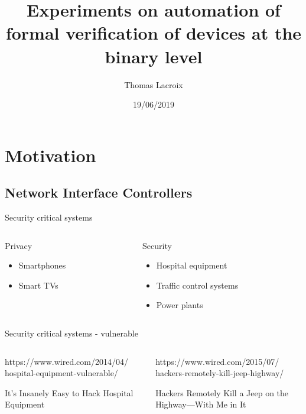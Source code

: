 \documentclass{beamer}
\title{Experiments on automation of formal verification of devices at the binary level}
\subtitle{}
\author{Thomas Lacroix}
\institute{INSA Lyon \\ Soutenance de PFE (Option R\&D)}
\date{19/06/2019}
\begin{document}
\begin{frame}
    \maketitle
\end{frame}


\section{Motivation}

\subsection{Network Interface Controllers}

\begin{frame}{Security critical systems}
    \begin{columns}
        \begin{column}{0.5\textwidth}
            Privacy

            \begin{itemize}
                \item Smartphones
                \item Smart TVs
            \end{itemize}
        \end{column}
        \begin{column}{0.5\textwidth}
            Security

            \begin{itemize}
                \item Hospital equipment
                \item Traffic control systems
                \item Power plants
            \end{itemize}
        \end{column}
    \end{columns}
\end{frame}

\begin{frame}{Security critical systems - vulnerable}
    \begin{columns}
        \begin{column}{0.5\textwidth}
            https://www.wired.com/2014/04/ hospital-equipment-vulnerable/

            It's Insanely Easy to Hack Hospital Equipment
        \end{column}
        \begin{column}{0.5\textwidth}
            https://www.wired.com/2015/07/ hackers-remotely-kill-jeep-highway/

            Hackers Remotely Kill a Jeep on the Highway—With Me in It
        \end{column}
    \end{columns}
\end{frame}
\end{document}
